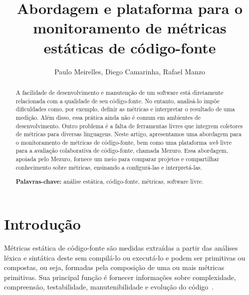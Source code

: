 \documentclass{llncs}
\begin{document}
\sloppy
\title{Abordagem e plataforma para o monitoramento de métricas estáticas de código-fonte}

\author{Paulo Meirelles, Diego Camarinha, Rafael Manzo}


\maketitle


\begin{abstract}

A facilidade de desenvolvimento e manutenção de um software está
diretamente relacionada com a qualidade de seu código-fonte.
No entanto, analisá-lo impõe dificuldades como, por exemplo, definir as
métricas e interpretar o resultado de uma medição. Além disso, essa prática
ainda não é comum em ambientes de desenvolvimento. Outro problema é a falta de
ferramentas livres que integrem coletores de métricas para diversas linguagens.
Neste artigo, apresentamos uma abordagem para o monitoramento de métricas de
código-fonte, bem como uma plataforma \textit{web} livre para a avaliação
colaborativa de código-fonte, chamada Mezuro. Essa abordagem, apoiada pelo
Mezuro, fornece um meio para comparar projetos e compartilhar conhecimento
sobre métricas, ensinando a configurá-las e interpretá-las.

\textbf{Palavras-chave:} análise estática, código-fonte, métricas, software
livre.

\end{abstract}


\section{Introdução}
\label{sec:intro}

Métricas estática de código-fonte são medidas extraídas a partir das análises
léxica e sintática deste sem compilá-lo ou executá-lo e podem ser primitivas ou
compostas, ou seja, formadas pela composição de uma ou mais métricas
primitivas. Sua principal função é fornecer informações sobre complexidade,
compreensão, testabilidade, manutenibilidade e evolução do
código~\cite{Henderson-Sellers96,Sato07}.
\end{document}
